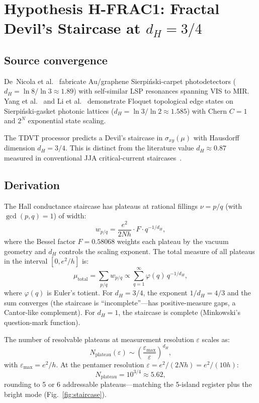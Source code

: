 \documentclass[11pt,letterpaper]{article}
\newcommand{\Flock}{F}
\begin{document}
\section{Hypothesis H-FRAC1: Fractal Devil's Staircase at $d_H = 3/4$}\label{sec:hfrac1}

\subsection{Source convergence}
De~Nicola et al.~\cite{DeNicola2020} fabricate Au/graphene Sierpi\'{n}ski-carpet photodetectors ($d_H = \ln 8/\ln 3 \approx 1.89$) with self-similar LSP resonances spanning VIS to MIR.  Yang et al.~\cite{Yang2020} and Li et al.~\cite{Li2023} demonstrate Floquet topological edge states on Sierpi\'{n}ski-gasket photonic lattices ($d_H = \ln 3/\ln 2 \approx 1.585$) with Chern $C = 1$ and $2^N$ exponential state scaling.

The TDVT processor predicts a Devil's staircase in $\sigma_{xy}(\mu)$ with Hausdorff dimension $d_H = 3/4$.  This is distinct from the literature value $d_H \approx 0.87$ measured in conventional JJA critical-current staircases~\cite{Halsey1985}.

\subsection{Derivation}
The Hall conductance staircase has plateaus at rational fillings $\nu = p/q$ (with $\gcd(p,q) = 1$) of width:
\begin{equation}\label{eq:plateau_width}
  w_{p/q} = \frac{e^2}{2Nh} \cdot \Flock \cdot q^{-1/d_H},
\end{equation}
where the Bessel factor $\Flock = 0.58068$ weights each plateau by the vacuum geometry and $d_H$ controls the scaling exponent.  The total measure of all plateaus in the interval $[0, e^2/h]$ is:
\begin{equation}
  \mu_{\mathrm{total}} = \sum_{p/q} w_{p/q} \propto \sum_{q=1}^{\infty} \varphi(q)\, q^{-1/d_H},
\end{equation}
where $\varphi(q)$ is Euler's totient.  For $d_H = 3/4$, the exponent $1/d_H = 4/3$ and the sum converges (the staircase is ``incomplete''---has positive-measure gaps, a Cantor-like complement).  For $d_H = 1$, the staircase is complete (Minkowski's question-mark function).

The number of resolvable plateaus at measurement resolution $\varepsilon$ scales as:
\begin{equation}\label{eq:nplateau}
  N_{\mathrm{plateau}}(\varepsilon) \sim \left(\frac{\varepsilon_{\max}}{\varepsilon}\right)^{d_H},
\end{equation}
with $\varepsilon_{\max} = e^2/h$.  At the pentamer resolution $\varepsilon = e^2/(2Nh) = e^2/(10h)$:
\begin{equation}
  N_{\mathrm{plateau}} = 10^{3/4} \approx 5.62,
\end{equation}
rounding to 5 or 6 addressable plateaus---matching the 5-island register plus the bright mode (Fig.~\ref{fig:staircase}).
\end{document}

